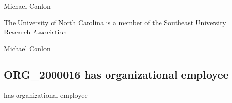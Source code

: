 \documentclass[letterpaper,10pt,english]{sphinxmanual}
\begin{document}
\begin{sphinxShadowBox}

\sphinxAtStartPar
Michael Conlon 
\end{sphinxShadowBox}

\begin{sphinxShadowBox}

\sphinxAtStartPar
{\hyperref[\detokenize{doc-ORG_0000001::doc}]{}}
\end{sphinxShadowBox}

\begin{sphinxShadowBox}

\sphinxAtStartPar
{\hyperref[\detokenize{doc-ORG_0000001::doc}]{}}
\end{sphinxShadowBox}

\begin{sphinxShadowBox}

\sphinxAtStartPar
The University of North Carolina is a member of the Southeast University Research Association
\end{sphinxShadowBox}

\begin{sphinxShadowBox}

\sphinxAtStartPar
Michael Conlon 
\end{sphinxShadowBox}
\begin{quote}

\ignorespaces \end{quote}


\subsection{ORG\_2000016 \sphinxhyphen{} has organizational employee}
\label{\detokenize{doc-ORG_2000016:org-2000016-has-organizational-employee}}\label{\detokenize{doc-ORG_2000016:index-0}}\label{\detokenize{doc-ORG_2000016::doc}}
\begin{sphinxShadowBox}

\sphinxAtStartPar
has organizational employee
\end{sphinxShadowBox}
\end{document}
